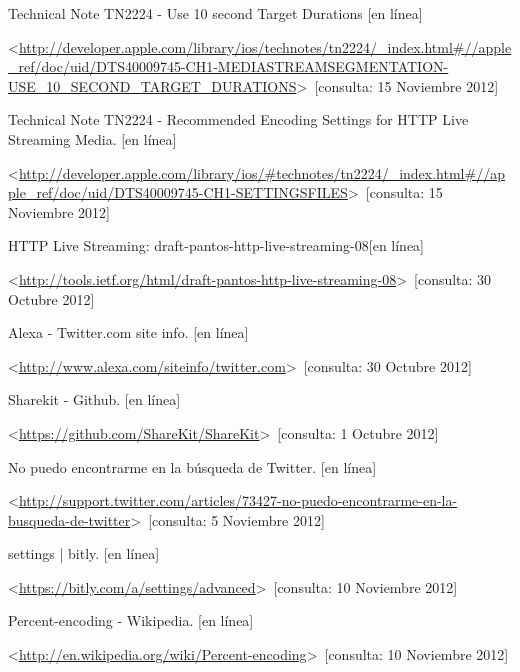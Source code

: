 
\begin{thebibliography}{99}
\begin{sloppypar}

Technical Note TN2224 - Use 10 second Target Durations [en línea]\

\textless \url{http://developer.apple.com/library/ios/technotes/tn2224/_index.html\#//apple_ref/doc/uid/DTS40009745-CH1-MEDIASTREAMSEGMENTATION-USE_10_SECOND_TARGET_DURATIONS}\textgreater \ [consulta: 15 Noviembre 2012]



Technical Note TN2224 - Recommended Encoding Settings for HTTP Live Streaming Media. [en línea]\

\textless \url{http://developer.apple.com/library/ios/#technotes/tn2224/_index.html\#//apple_ref/doc/uid/DTS40009745-CH1-SETTINGSFILES}\textgreater \ [consulta: 15 Noviembre 2012]

HTTP Live Streaming: draft-pantos-http-live-streaming-08[en línea]\

\textless \url{http://tools.ietf.org/html/draft-pantos-http-live-streaming-08}\textgreater \ [consulta: 30 Octubre 2012]

Alexa - Twitter.com site info. [en línea]\

\textless \url{http://www.alexa.com/siteinfo/twitter.com}\textgreater \ [consulta: 30 Octubre 2012] 

Sharekit - Github. [en línea]\

\textless \url{https://github.com/ShareKit/ShareKit}\textgreater \ [consulta: 1 Octubre 2012] 


No puedo encontrarme en la búsqueda de Twitter. [en línea]

\textless \url{http://support.twitter.com/articles/73427-no-puedo-encontrarme-en-la-busqueda-de-twitter}\textgreater \ [consulta: 5 Noviembre 2012] 

settings | bitly. [en línea]\

\textless \url{https://bitly.com/a/settings/advanced}\textgreater \ [consulta: 10 Noviembre 2012] 

Percent-encoding - Wikipedia. [en línea]\

\textless \url{http://en.wikipedia.org/wiki/Percent-encoding}\textgreater \ [consulta: 10 Noviembre 2012] 



\end{sloppypar}
\end{thebibliography}
